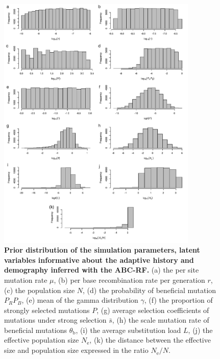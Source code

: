 \documentclass[a4paper, 12pt]{article}
\begin{document}
\newpage



\newpage

\begin{figure}[ht]
  \centering
  \includegraphics[width=0.85\textwidth]{Figures/FigureS1_parameters_histograms.pdf}
  \small\caption{\textbf{Prior distribution of the simulation parameters, latent variables informative about the adaptive history and demography inferred with the ABC-RF.} (a) the per site mutation rate $\mu$, (b)  per base recombination rate per generation $r$, (c) the population size $N$, (d) the probability of beneficial mutation $P_RP_B$, (e) mean of the gamma distribution $\gamma$, (f) the proportion of strongly selected mutations $P$, (g) average selection coefficients of mutations under strong selection $\bar{s}$, (h) the scale mutation rate of beneficial mutations $\theta_{\mathrm{b}}$, (i) the average substitution load $L$, (j) the effective population size $N_{\mathrm{e}}$, (k) the distance between the effective size and population size expressed in the ratio $N_{\mathrm{e}}/N$.}
  \label{fig:supple_pods_priors}
\end{figure}
\end{document}
